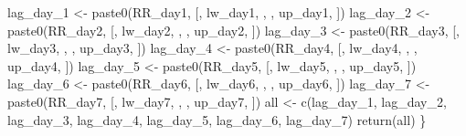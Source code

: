 \documentclass[
]{article}
\newenvironment{Shaded}{\begin{snugshade}}{\end{snugshade}}
\newcommand{\FunctionTok}[1]{\textcolor[rgb]{0.00,0.00,0.00}{#1}}
\newcommand{\NormalTok}[1]{#1}
\newcommand{\OtherTok}[1]{\textcolor[rgb]{0.56,0.35,0.01}{#1}}
\newcommand{\StringTok}[1]{\textcolor[rgb]{0.31,0.60,0.02}{#1}}
\begin{document}
\begin{Shaded}
\begin{Highlighting}[]
\NormalTok{  lag\_day\_1 }\OtherTok{\textless{}{-}} \FunctionTok{paste0}\NormalTok{(RR\_day1, }\StringTok{\textquotesingle{} [\textquotesingle{}}\NormalTok{, lw\_day1, }\StringTok{\textquotesingle{}, \textquotesingle{}}\NormalTok{, up\_day1, }\StringTok{\textquotesingle{}]\textquotesingle{}}\NormalTok{)}
\NormalTok{  lag\_day\_2 }\OtherTok{\textless{}{-}} \FunctionTok{paste0}\NormalTok{(RR\_day2, }\StringTok{\textquotesingle{} [\textquotesingle{}}\NormalTok{, lw\_day2, }\StringTok{\textquotesingle{}, \textquotesingle{}}\NormalTok{, up\_day2, }\StringTok{\textquotesingle{}]\textquotesingle{}}\NormalTok{)}
\NormalTok{  lag\_day\_3 }\OtherTok{\textless{}{-}} \FunctionTok{paste0}\NormalTok{(RR\_day3, }\StringTok{\textquotesingle{} [\textquotesingle{}}\NormalTok{, lw\_day3, }\StringTok{\textquotesingle{}, \textquotesingle{}}\NormalTok{, up\_day3, }\StringTok{\textquotesingle{}]\textquotesingle{}}\NormalTok{)}
\NormalTok{  lag\_day\_4 }\OtherTok{\textless{}{-}} \FunctionTok{paste0}\NormalTok{(RR\_day4, }\StringTok{\textquotesingle{} [\textquotesingle{}}\NormalTok{, lw\_day4, }\StringTok{\textquotesingle{}, \textquotesingle{}}\NormalTok{, up\_day4, }\StringTok{\textquotesingle{}]\textquotesingle{}}\NormalTok{)}
\NormalTok{  lag\_day\_5 }\OtherTok{\textless{}{-}} \FunctionTok{paste0}\NormalTok{(RR\_day5, }\StringTok{\textquotesingle{} [\textquotesingle{}}\NormalTok{, lw\_day5, }\StringTok{\textquotesingle{}, \textquotesingle{}}\NormalTok{, up\_day5, }\StringTok{\textquotesingle{}]\textquotesingle{}}\NormalTok{)}
\NormalTok{  lag\_day\_6 }\OtherTok{\textless{}{-}} \FunctionTok{paste0}\NormalTok{(RR\_day6, }\StringTok{\textquotesingle{} [\textquotesingle{}}\NormalTok{, lw\_day6, }\StringTok{\textquotesingle{}, \textquotesingle{}}\NormalTok{, up\_day6, }\StringTok{\textquotesingle{}]\textquotesingle{}}\NormalTok{)}
\NormalTok{  lag\_day\_7 }\OtherTok{\textless{}{-}} \FunctionTok{paste0}\NormalTok{(RR\_day7, }\StringTok{\textquotesingle{} [\textquotesingle{}}\NormalTok{, lw\_day7, }\StringTok{\textquotesingle{}, \textquotesingle{}}\NormalTok{, up\_day7, }\StringTok{\textquotesingle{}]\textquotesingle{}}\NormalTok{)}
\NormalTok{  all }\OtherTok{\textless{}{-}} \FunctionTok{c}\NormalTok{(lag\_day\_1, lag\_day\_2, lag\_day\_3, lag\_day\_4, lag\_day\_5, }
\NormalTok{           lag\_day\_6, lag\_day\_7)}
  \FunctionTok{return}\NormalTok{(all)}
\NormalTok{\}}
\end{Highlighting}
\end{Shaded}
\end{document}
